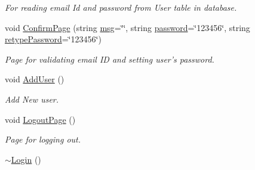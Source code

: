 \begin{DoxyCompactItemize}
\begin{DoxyCompactList}\small\item\em For reading email Id and password from User table in database. \end{DoxyCompactList}\item 
void \hyperlink{classLogin_a38f58197839dc8918425f69399ed5f8f}{Confirm\-Page} (string \hyperlink{classInputDetail_a1abb16cd695678c3fa05e3c812823fee}{msg}=\char`\"{}\char`\"{}, string \hyperlink{classLogin_a39f7fd03b2b27c927c657ee73e7fcbbc}{password}=\char`\"{}123456\char`\"{}, string \hyperlink{classLogin_ade36f8943aafce470ef4b8353c79b2c6}{retype\-Password}=\char`\"{}123456\char`\"{})
\begin{DoxyCompactList}\small\item\em Page for validating email I\-D and setting user's password. \end{DoxyCompactList}\item 
\hypertarget{classLogin_ac91737b2085d0b7e8943f49f2d08a0ff}{void \hyperlink{classLogin_ac91737b2085d0b7e8943f49f2d08a0ff}{Add\-User} ()}\label{classLogin_ac91737b2085d0b7e8943f49f2d08a0ff}

\begin{DoxyCompactList}\small\item\em Add New user. \end{DoxyCompactList}\item 
void \hyperlink{classLogin_a153d72df8d3333317e60219e8f6b8257}{Logout\-Page} ()
\begin{DoxyCompactList}\small\item\em Page for logging out. \end{DoxyCompactList}\item 
\hyperlink{classLogin_a659bc7233ec12c79b9fa523c1734fbbc}{$\sim$\-Login} ()
\end{DoxyCompactItemize}
